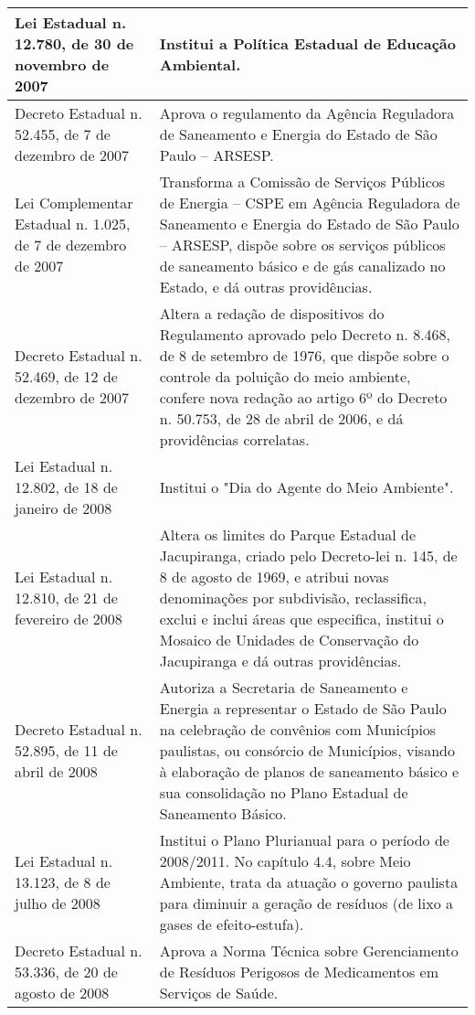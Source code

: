 \begin{center}
\begin{longtable}{|p{}|p{}|}
			\hline
			Lei  Estadual  n.  12.780,  de  30 de novembro de 2007 & Institui a Política Estadual de Educação Ambiental. \\
			\hline
			Decreto Estadual n. 52.455, de 7 de dezembro de 2007 & Aprova  o  regulamento  da  Agência  Reguladora  de  Saneamento  e  Energia  do Estado de São Paulo – ARSESP. \\
			\hline
			Lei Complementar Estadual n. 1.025,  de  7  de  dezembro  de 2007 & Transforma a Comissão de Serviços Públicos de Energia  – CSPE em Agência Reguladora  de  Saneamento  e  Energia  do  Estado  de  São  Paulo  –  ARSESP, dispõe sobre os serviços públicos de saneamento básico e de gás canalizado no Estado, e dá outras providências. \\
			\hline
			Decreto Estadual n. 52.469, de 12 de dezembro de 2007 & Altera  a  redação  de  dispositivos  do  Regulamento  aprovado  pelo  Decreto  n. 8.468, de 8 de setembro de 1976, que dispõe sobre o controle da poluição do meio ambiente, confere nova redação ao artigo 6º do Decreto n. 50.753, de 28 de abril de 2006, e dá providências correlatas. \\
			\hline
			Lei  Estadual  n.  12.802,  de  18 de janeiro de 2008 & Institui o "Dia do Agente do Meio Ambiente". \\
			\hline
			Lei  Estadual  n.  12.810,  de  21 de fevereiro de 2008 & Altera os limites do Parque Estadual de Jacupiranga, criado pelo Decreto-lei n. 145,  de  8  de  agosto  de  1969,  e  atribui  novas  denominações  por  subdivisão, reclassifica, exclui e inclui áreas que especifica, institui o Mosaico de Unidades de Conservação do Jacupiranga e dá outras providências. \\
			\hline
			Decreto Estadual n. 52.895, de 11 de abril de 2008 & Autoriza a Secretaria de Saneamento e Energia a representar o Estado de São Paulo  na  celebração  de  convênios  com  Municípios  paulistas,  ou  consórcio  de Municípios,  visando  à  elaboração  de  planos  de  saneamento  básico  e  sua consolidação no Plano Estadual de Saneamento Básico. \\
			\hline
			Lei Estadual n. 13.123, de 8 de julho de 2008 & Institui o Plano Plurianual para o período de 2008/2011. No capítulo 4.4, sobre Meio Ambiente, trata da atuação o governo paulista para diminuir a geração de resíduos (de lixo a gases de efeito-estufa). \\
			\hline
			Decreto Estadual n. 53.336, de 20 de agosto de 2008 & Aprova  a  Norma  Técnica  sobre  Gerenciamento  de  Resíduos  Perigosos  de Medicamentos em Serviços de Saúde. \\

\end{longtable}
\end{center}
